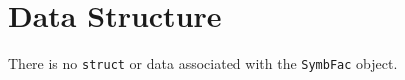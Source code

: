 \par
\section{Data Structure}
\par
There is no {\tt struct} or data associated with the {\tt SymbFac}
object.
